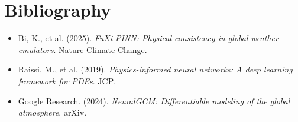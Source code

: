 \section*{Bibliography}
\begin{itemize}
    \item Bi, K., et al. (2025). \textit{FuXi-PINN: Physical consistency in global weather emulators}. Nature Climate Change.
    \item Raissi, M., et al. (2019). \textit{Physics-informed neural networks: A deep learning framework for PDEs}. JCP.
    \item Google Research. (2024). \textit{NeuralGCM: Differentiable modeling of the global atmosphere}. arXiv.
\end{itemize}
